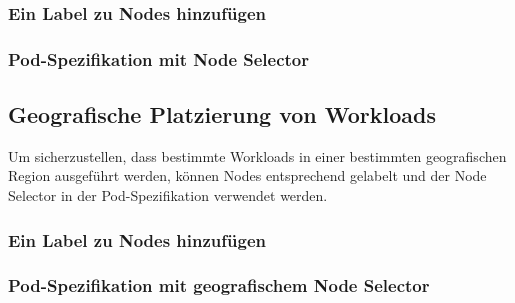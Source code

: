 \subsubsection{Ein Label zu Nodes hinzufügen}


\subsubsection{Pod-Spezifikation mit Node Selector}

\newpage
\subsection{Geografische Platzierung von Workloads}
Um sicherzustellen, dass bestimmte Workloads in einer bestimmten geografischen Region ausgeführt werden, können Nodes entsprechend gelabelt und der Node Selector in der Pod-Spezifikation verwendet werden.

\subsubsection{Ein Label zu Nodes hinzufügen}


\subsubsection{Pod-Spezifikation mit geografischem Node Selector}
